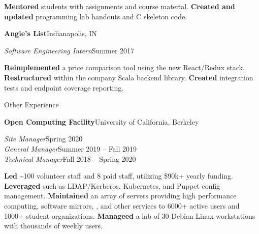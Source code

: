 \begin{minipage}[t]{0.665\textwidth}
\begin{adjustwidth}{10pt}{}
    \textbf{Mentored} students with assignments and course material.
    \textbf{Created and updated} programming lab handouts and C skeleton code.
  \end{adjustwidth}

  \vspace{5pt}
  \textbf{Angie's List}\quad{}\hfill Indianapolis, IN
  \begin{adjustwidth}{10pt}{}
    \emph{Software Engineering Intern}\hfill Summer 2017

    \textbf{Reimplemented} a price comparison tool using the new React/Redux stack.
    \textbf{Restructured}  within the company Scala backend library.
    \textbf{Created} integration tests and endpoint coverage reporting.
  \end{adjustwidth}





  \vspace{10pt}

  {\sectionfont Other Experience}

  \vspace{5pt}
  \textbf{Open Computing Facility}\quad{}\hfill University of California, Berkeley
  \begin{adjustwidth}{10pt}{}
    \emph{Site Manager}\hfill Spring 2020\\
    \emph{General Manager}\hfill Summer 2019 -- Fall 2019\\
    \emph{Technical Manager}\hfill Fall 2018 -- Spring 2020

    \textbf{Led} \textasciitilde{}100 volunteer staff and 8 paid staff, utilizing \$90k+ yearly funding.
    \textbf{Leveraged}  such as LDAP/Kerberos, Kubernetes, and Puppet config management.
    \textbf{Maintained} an array of servers providing high performance computing, software mirrors, , and other services to 6000+ active users and 1000+ student organizations.
    \textbf{Manageed} a lab of 30 Debian Linux workstations with thousands of weekly users.


\end{adjustwidth}
\end{minipage}
